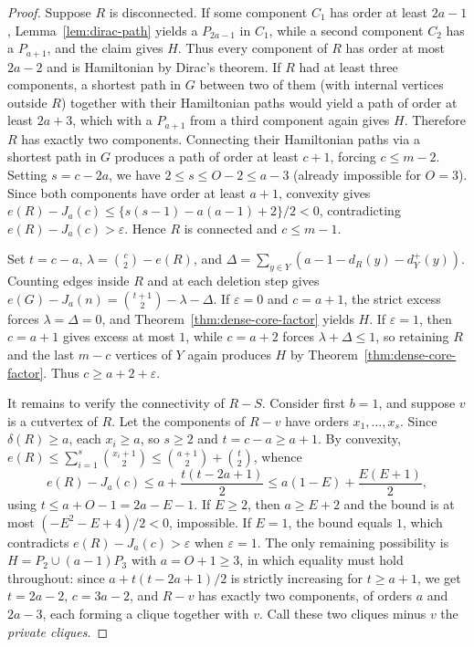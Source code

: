 \documentclass[10pt]{article}
\theoremstyle{compactplain}
\theoremstyle{remark}\newtheorem{remark}[theorem]{Remark}
\begin{document}
\begin{proof}
Suppose $R$ is disconnected. If some component $C_1$ has order at least
$2a-1$, Lemma~\ref{lem:dirac-path} yields a $P_{2a-1}$ in $C_1$, while a
second component $C_2$ has a $P_{a+1}$, and the claim gives $H$. Thus
every component of $R$ has order at most $2a-2$ and is Hamiltonian by
Dirac's theorem. If $R$ had at least three components, a shortest path
in $G$ between two of them (with internal vertices outside $R$) together
with their Hamiltonian paths would yield a path of order at least
$2a+3$, which with a $P_{a+1}$ from a third component again gives $H$.
Therefore $R$ has exactly two components. Connecting their Hamiltonian
paths via a shortest path in $G$ produces a path of order at least
$c+1$, forcing $c\le m-2$. Setting $s=c-2a$, we have
$2\le s\le O-2\le a-3$ (already impossible for $O=3$). Since both
components have order at least $a+1$, convexity gives
$e(R)-J_a(c)\le\{s(s-1)-a(a-1)+2\}/2<0$, contradicting
$e(R)-J_a(c)>\varepsilon$. Hence $R$ is connected and $c\le m-1$.

Set $t=c-a$, $\lambda=\binom{c}{2}-e(R)$, and
$\Delta=\sum_{y\in Y}(a-1-d_R(y)-d_Y^+(y))$. Counting edges inside $R$
and at each deletion step gives
$e(G)-J_a(n)=\binom{t+1}{2}-\lambda-\Delta$. If $\varepsilon=0$ and
$c=a+1$, the strict excess forces $\lambda=\Delta=0$, and
Theorem~\ref{thm:dense-core-factor} yields $H$. If $\varepsilon=1$, then
$c=a+1$ gives excess at most $1$, while $c=a+2$ forces
$\lambda+\Delta\le1$, so retaining $R$ and the last $m-c$ vertices of
$Y$ again produces $H$ by Theorem~\ref{thm:dense-core-factor}. Thus
$c\ge a+2+\varepsilon$.

It remains to verify the connectivity of $R-S$. Consider first $b=1$,
and suppose $v$ is a cutvertex of $R$. Let the components of $R-v$ have
orders $x_1,\ldots,x_s$. Since $\delta(R)\ge a$, each $x_i\ge a$, so
$s\ge2$ and $t=c-a\ge a+1$. By convexity,
$e(R)\le\sum_{i=1}^s\binom{x_i+1}{2}\le\binom{a+1}{2}+\binom{t}{2}$,
whence
\[
 e(R)-J_a(c)\le a+\frac{t(t-2a+1)}{2}
 \le a(1-E)+\frac{E(E+1)}{2},
\]
using $t\le a+O-1=2a-E-1$. If $E\ge2$, then $a\ge E+2$ and the bound is
at most $(-E^2-E+4)/2<0$, impossible. If $E=1$, the bound equals $1$,
which contradicts $e(R)-J_a(c)>\varepsilon$ when $\varepsilon=1$. The
only remaining possibility is $H=P_2\cup(a-1)P_3$ with $a=O+1\ge3$, in
which equality must hold throughout: since $a+t(t-2a+1)/2$ is strictly
increasing for $t\ge a+1$, we get $t=2a-2$, $c=3a-2$, and $R-v$ has
exactly two components, of orders $a$ and $2a-3$, each forming a clique
together with $v$. Call these two cliques minus $v$ the \emph{private
cliques}.


\end{proof}
\end{document}

